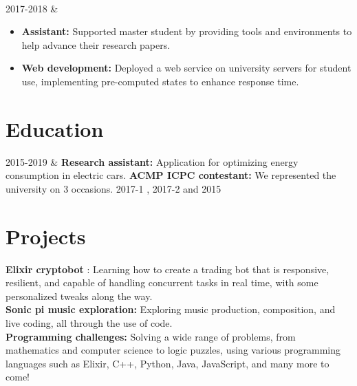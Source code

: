 \documentclass[
    changecolor={111, 156, 45}, 
]{cv-roald}
\begin{document}
        \
                
2017-2018   &   
                \begin{itemize}
                \item \textbf{Assistant:} Supported master student by providing tools and environments to help advance their research papers.
                \item  \textbf{Web development:} Deployed a web service on university servers for student use, implementing pre-computed states to enhance response time.
                \end{itemize} 



\section*{Education}

2015-2019   &    
\newline
                \textbf{Research assistant:} Application for optimizing energy consumption in electric cars.
                \newline
                \textbf{ACMP ICPC contestant:} We represented the university on 3 occasions. 2017-1 , 2017-2  and 2015 
                \\
                
                


\section*{Projects}

\textbf{Elixir cryptobot} : Learning how to create a trading bot that is responsive, resilient, and capable of handling concurrent tasks in real time, with some personalized tweaks along the way. \\
\textbf{Sonic pi music exploration:} Exploring music production, composition, and live coding, all through the use of code. \\
\textbf{Programming challenges:} Solving a wide range of problems, from mathematics and computer science to logic puzzles, using various programming languages such as Elixir, C++, Python, Java, JavaScript, and many more to come!
\end{document}
